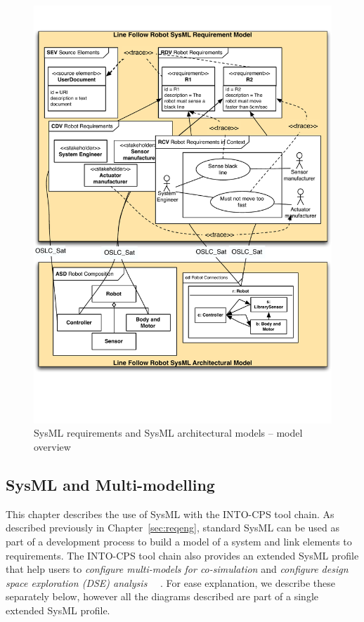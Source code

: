 \begin{description}
\begin{figure}
	\centering
	\includegraphics[scale=0.7]{figures/RE_2}
\caption{SysML requirements and SysML architectural models -- model overview}
\label{fig:re-multisysml}
\end{figure}
\end{description}

\subsection{SysML and Multi-modelling}
\label{sec:method:sysml}

This chapter describes the use of SysML with the INTO-CPS tool chain. As described previously in Chapter~\ref{sec:reqeng}, standard SysML can be used as part of a development process to build a model of a system and link elements to requirements. The INTO-CPS tool chain also provides an extended SysML profile that help users to \emph{configure multi-models for co-simulation} and \emph{configure design space exploration (DSE) analysis}~ ~\cite{INTOCPSD2.1a,INTOCPSD2.2a,INTOCPSD2.3a,INTOCPSD41c,INTOCPSD4.2c,INTOCPSD4.3c}. For ease explanation, we describe these separately below, however all the diagrams described are part of a single extended SysML profile.

